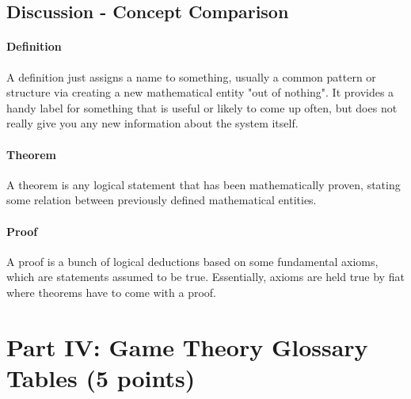 \documentclass[runningheads]{llncs}
\begin{document}
\subsection{Discussion - Concept Comparison}

\paragraph{Definition}
A definition just assigns a name to something, usually a common pattern or structure via creating a new mathematical entity "out of nothing". It provides a handy label for something that is useful or likely to come up often, but does not really give you any new information about the system itself.

\paragraph{Theorem}

A theorem is any logical statement that has been mathematically proven, stating some relation between previously defined mathematical entities. 

\paragraph{Proof}
A proof is a bunch of logical deductions based on some fundamental axioms, which are statements assumed to be true. Essentially, axioms are held true by fiat where theorems have to come with a proof.

\newpage
\section{Part IV: Game Theory Glossary Tables (5 points)}
\end{document}
